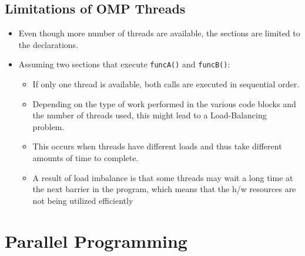 \documentclass{article}
\begin{document}
\subsection{Limitations of OMP Threads}
\begin{itemize}
    \item Even though more number of threads are available, the sections are limited to the declarations.
    
    \item Assuming two sections that execute \texttt{funcA()} and \texttt{funcB()}:
    \begin{itemize}
        \item If only one thread is available, both calls are executed in sequential order.
        
        \item Depending on the type of work performed in the various code blocks and the number of threads used, this might lead to a Load-Balancing problem.
        
        \item This occurs when threads have different loads and thus take different amounts of time to complete.
        
        \item A result of load imbalance is that some threads may wait a long time at the next barrier in the program, which means that the h/w resources are not being utilized efficiently
    \end{itemize}

\end{itemize}

\section{Parallel Programming}
\end{document}
